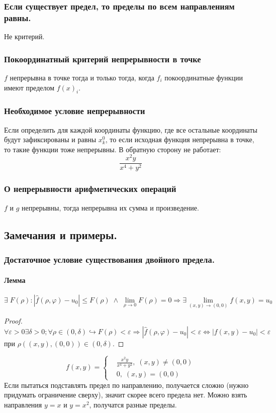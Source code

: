 \documentclass{article}
\begin{document}
\subsubsection{Если существует предел, то пределы по всем направлениям равны.}
Не критерий.
\subsubsection{Покоординатный критерий непрерывности в точке}
$f$ непрерывна в точке тогда и только тогда, когда $f_i$ покоординатные функции имеют пределом $f(x)_i$.
\subsubsection{Необходимое условие непрерывности}
Если определить для каждой координаты функцию, где все остальные координаты будут зафиксированы и равны $x^0_k$, то если исходная функция непрерывна в точке, то такие функции тоже непрерывны.
В обратную сторону не работает:
$$ \frac{x^2 y}{x^4 + y^2}$$
\subsubsection{О непрерывности арифметических операций}
$f$ и $g$ непрерывны, тогда непрерывна их сумма и произведение.
\newpage
\subsection{Замечания и примеры.}
\subsubsection{Достаточное условие существования двойного предела.}
\paragraph*{Лемма}$$\exists \; F(\rho) : |\hat{f}(\rho,\varphi) - u_0| \leq F(\rho) \; \wedge  \; \lim\limits_{\rho\to0}F(\rho)=0 \Rightarrow \exists \lim\limits_{(x,y)\to(0,0)}f(x,y)=u_0$$
\begin{proof}
    $$ \forall \varepsilon > 0 \exists \delta > 0; \forall \rho \in (0, \delta ) \hookrightarrow F(\rho) < \varepsilon  \Rightarrow |\hat{f}(\rho,\varphi) - u_0| < \varepsilon \Leftrightarrow |f(x,y) - u_0| < \varepsilon$$
    при $\rho((x,y), (0,0) )\in(0, \delta)$.
\end{proof}
\begin{equation*}
    f(x,y) = \left\{
    \begin{aligned}
         & \frac{x^2 y}{x^4 + y^2}, \; (x,y) \neq (0,0) \\
         & 0, \; (x,y) = (0,0)
    \end{aligned}
    \right.
\end{equation*}
Если пытаться подставлять предел по направлению, получается сложно (нужно придумать ограничение сверху), значит скорее всего предела нет.
Можно взять направления $y = x$ и $y = x^2$, получатся разные пределы.
\end{document}
